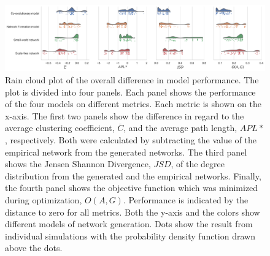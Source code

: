 \documentclass[11pt]{article}
\begin{document}
\begin{figure}[H]
    \centering
    \includegraphics[width=.99\linewidth]{../plots/overall/Model_Evaluation_Overview.png}
  \caption{Rain cloud plot of the overall difference in model performance. The plot is divided into four panels. Each panel shows the performance of the four models on different metrics. Each metric is shown on the x-axis. The first two panels show the difference in regard to the average clustering coefficient, $\overline{C}$, and the average path length, $APL*$, respectively. Both were calculated by subtracting the value of the empirical network from the generated networks. The third panel shows the Jensen Shannon Divergence, $JSD$, of the degree distribution from the generated and the empirical networks. Finally, the fourth panel shows the objective function which was minimized during optimization, $O(A,G)$. Performance is indicated by the distance to zero for all metrics. Both the y-axis and the colors show different models of network generation. Dots show the result from individual simulations with the probability density function drawn above the dots.}
  \label{fig:eval_overall}
\end{figure}
\end{document}
